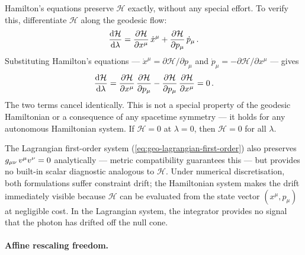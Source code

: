 Hamilton's equations preserve $\mathcal{H}$ exactly, without any special
effort.  To verify this, differentiate $\mathcal{H}$ along the geodesic
flow:
%
\begin{equation}
  \frac{\mathrm{d}\mathcal{H}}{\mathrm{d}\lambda}
    = \frac{\partial\mathcal{H}}{\partial x^\mu}\,\dot{x}^\mu
      + \frac{\partial\mathcal{H}}{\partial p_\mu}\,\dot{p}_\mu \,.
  \label{eq:H-dot}
\end{equation}
%
Substituting Hamilton's equations ---
$\dot{x}^\mu = \partial\mathcal{H}/\partial p_\mu$ and
$\dot{p}_\mu = -\partial\mathcal{H}/\partial x^\mu$ --- gives
%
\begin{equation}
  \frac{\mathrm{d}\mathcal{H}}{\mathrm{d}\lambda}
    = \frac{\partial\mathcal{H}}{\partial x^\mu}\,
      \frac{\partial\mathcal{H}}{\partial p_\mu}
      - \frac{\partial\mathcal{H}}{\partial p_\mu}\,
        \frac{\partial\mathcal{H}}{\partial x^\mu}
    = 0 \,.
  \label{eq:H-conservation}
\end{equation}
%
The two terms cancel identically.  This is not a special property of
the geodesic Hamiltonian or a consequence of any spacetime symmetry ---
it holds for any autonomous Hamiltonian system.  If $\mathcal{H} = 0$
at $\lambda = 0$, then $\mathcal{H} = 0$ for all $\lambda$.

The Lagrangian first-order system (\cref{eq:geo-lagrangian-first-order})
also preserves $g_{\mu\nu}\,v^\mu v^\nu = 0$ analytically --- metric
compatibility guarantees this --- but provides no built-in scalar
diagnostic analogous to $\mathcal{H}$.  Under numerical discretisation,
both formulations suffer constraint drift; the Hamiltonian system makes
the drift immediately visible because $\mathcal{H}$ can be evaluated
from the state vector $(x^\mu, p_\mu)$ at negligible cost.  In the
Lagrangian system, the integrator provides no signal that the photon has
drifted off the null cone.

\paragraph{Affine rescaling freedom.}

